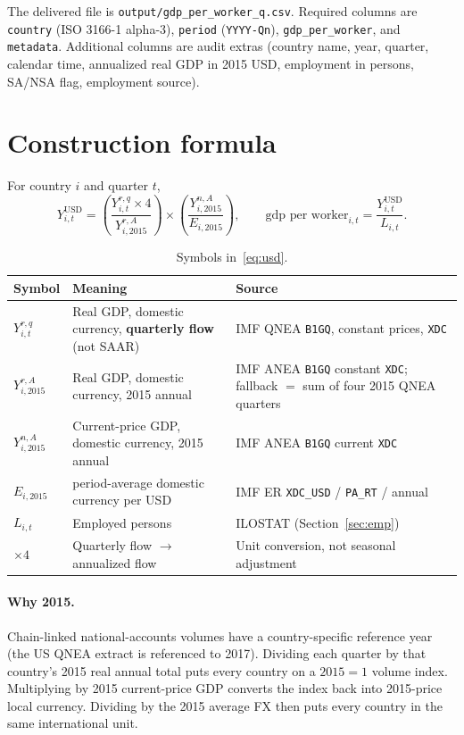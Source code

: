 \documentclass[11pt]{article}
\begin{document}
The delivered file is
\texttt{output/gdp\_per\_worker\_q.csv}.
Required columns are \texttt{country} (ISO 3166-1 alpha-3), \texttt{period}
(\texttt{YYYY-Qn}), \texttt{gdp\_per\_worker}, and \texttt{metadata}. Additional
columns are audit extras (country name, year, quarter, calendar time,
annualized real GDP in 2015 USD, employment in persons, SA/NSA flag, employment
source).

\section{Construction formula}

For country $i$ and quarter $t$,
\begin{equation}
\label{eq:usd}
Y^{\mathrm{USD}}_{i,t}
=
\left(\frac{Y^{r,q}_{i,t}\times 4}{Y^{r,A}_{i,2015}}\right)
\times
\left(\frac{Y^{n,A}_{i,2015}}{E_{i,2015}}\right),
\qquad
\text{gdp per worker}_{i,t}
=
\frac{Y^{\mathrm{USD}}_{i,t}}{L_{i,t}}.
\end{equation}

\begin{table}[h]
\centering
\caption{Symbols in~\eqref{eq:usd}.}
\begin{tabular}{>{\raggedright\arraybackslash}p{}
                >{\raggedright\arraybackslash}p{}
                >{\raggedright\arraybackslash}p{}}
\toprule
Symbol & Meaning & Source \\
\midrule
$Y^{r,q}_{i,t}$ &
Real GDP, domestic currency, \textbf{quarterly flow} (not SAAR) &
IMF QNEA \texttt{B1GQ}, constant prices, \texttt{XDC} \\
$Y^{r,A}_{i,2015}$ &
Real GDP, domestic currency, 2015 annual &
IMF ANEA \texttt{B1GQ} constant \texttt{XDC};
fallback $=$ sum of four 2015 QNEA quarters \\
$Y^{n,A}_{i,2015}$ &
Current-price GDP, domestic currency, 2015 annual &
IMF ANEA \texttt{B1GQ} current \texttt{XDC} \\
$E_{i,2015}$ &
2015 period-average domestic currency per USD &
IMF ER \texttt{XDC\_USD} / \texttt{PA\_RT} / annual \\
$L_{i,t}$ &
Employed persons &
ILOSTAT (Section~\ref{sec:emp}) \\
$\times 4$ &
Quarterly flow $\to$ annualized flow &
Unit conversion, not seasonal adjustment \\
\bottomrule
\end{tabular}
\end{table}

\paragraph{Why 2015.}
Chain-linked national-accounts volumes have a country-specific reference year
(the US QNEA extract is referenced to 2017). Dividing each quarter by that
country's 2015 real annual total puts every country on a $2015=1$ volume index.
Multiplying by 2015 current-price GDP converts the index back into 2015-price
local currency. Dividing by the 2015 average FX then puts every country in the
same international unit.
\end{document}
